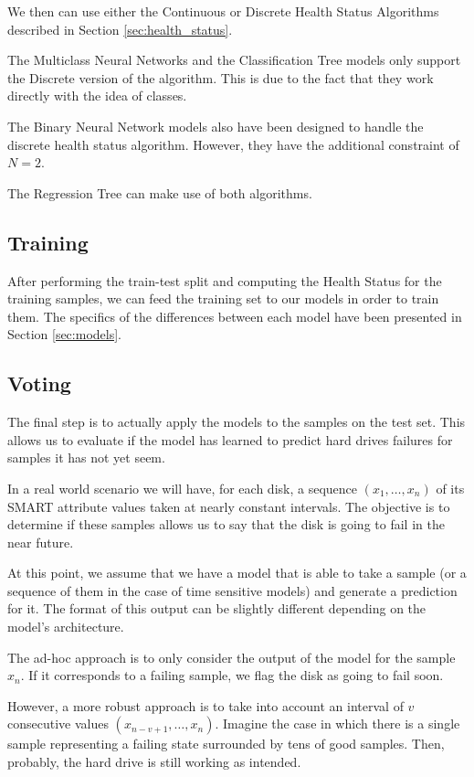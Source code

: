 We then can use either the Continuous or Discrete Health Status Algorithms described in Section \ref{sec:health_status}.

The Multiclass Neural Networks and the Classification Tree models only support the Discrete version of the algorithm.
This is due to the fact that they work directly with the idea of classes.

The Binary Neural Network models also have been designed to handle the discrete health status algorithm.
However, they have the additional constraint of $N = 2$.

The Regression Tree can make use of both algorithms.

\subsection{Training}

After performing the train-test split and computing the Health Status for the training samples, we can feed the training set to our models in order to train them.
The specifics of the differences between each model have been presented in Section \ref{sec:models}.

\subsection{Voting}\label{subsec:voting}

The final step is to actually apply the models to the samples on the test set.
This allows us to evaluate if the model has learned to predict hard drives failures for samples it has not yet seem.

In a real world scenario we will have, for each disk, a sequence $(x_1,\dots,x_n)$ of its SMART attribute values taken at nearly constant intervals.
The objective is to determine if these samples allows us to say that the disk is going to fail in the near future.

At this point, we assume that we have a model that is able to take a sample (or a sequence of them in the case of time sensitive models) and generate a prediction for it.
The format of this output can be slightly different depending on the model's architecture.

The ad-hoc approach is to only consider the output of the model for the sample $x_n$.
If it corresponds to a failing sample, we flag the disk as going to fail soon.

However, a more robust approach is to take into account an interval of $v$ consecutive values $(x_{n-v+1},\dots,x_n)$.
Imagine the case in which there is a single sample representing a failing state surrounded by tens of good samples.
Then, probably, the hard drive is still working as intended.

